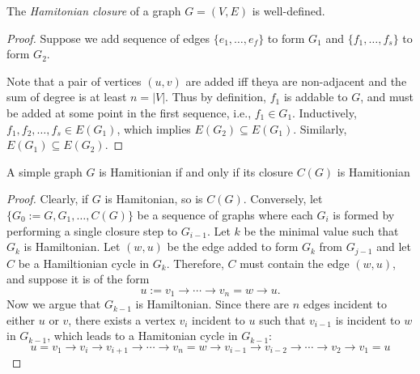 \begin{lemma}
The \emph{Hamitonian closure} of a graph $G=(V,E)$ is well-defined.
\end{lemma}
\begin{proof}
Suppose we add sequence of edges $\{e_1,\dots,e_f\}$ to form $G_1$ and $\{f_1,\dots,f_s\}$ to form $G_2$.

Note that a pair of vertices $(u,v)$ are added iff theya are non-adjacent and the sum of degree is at least $n=|V|$.
Thus by definition, $f_1$ is addable to $G$, and must be added at some point in the first sequence, i.e., $f_1\in G_1$.
Inductively, $f_1,f_2,\dots,f_s\in E(G_1)$, which implies $E(G_2)\subseteq E(G_1)$.
Similarly, $E(G_1)\subseteq E(G_2)$.
\end{proof}


\begin{theorem}
A simple graph $G$ is Hamitionian if and only if its closure $C(G)$ is Hamitionian
\end{theorem}
\begin{proof}
Clearly, if $G$ is Hamitonian, so is $C(G)$. Conversely, let $\{G_0:=G,G_1,\dots,C(G)\}$ be a sequence of graphs where each $G_i$ is formed by performing a single closure step to $G_{i-1}.$
Let $k$ be the minimal value such that $G_k$ is Hamiltonian.
Let $(w,u)$ be the edge added to form $G_k$ from $G_{j-1}$ and let $C$ be a Hamiltionian cycle in $G_k$.
Therefore, $C$ must contain the edge $(w,u)$, and suppose it is of the form
\[
u:=v_1\to\cdots\to v_n=w\to u.
\]
Now we argue that $G_{k-1}$ is Hamiltonian.
Since there are $n$ edges incident to either $u$ or $v$, there exists a vertex $v_i$ incident to $u$ such that $v_{i-1}$ is incident to $w$ in $G_{k-1}$, which leads to a Hamitonian cycle in $G_{k-1}$:
\[
u=v_1\to v_i\to v_{i+1}\to\cdots\to v_n=w\to v_{i-1}\to v_{i-2}\to\cdots\to v_2\to v_1=u
\]
\end{proof}

